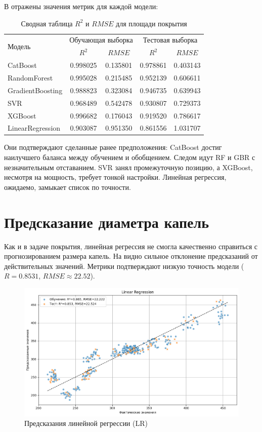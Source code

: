 В  отражены значения метрик для каждой модели:

\begin{table}[htbp!]
	\centering\small
	\caption{Сводная таблица $R^2$ и $RMSE$ для площади покрытия}
	\label{tab:coverage-table}		
	\begin{tabular}{|l|c|c|c|c|}
		\hline
		\multirow{2}{*}{Модель} & \multicolumn{2}{|c|}{Обучающая выборка} & \multicolumn{2}{c|}{Тестовая выборка}\\\cline{2-5} 
		& $R^2$ & $RMSE$ & $R^2$ & $RMSE$\\\hline
		CatBoost&0.998025&0.135801&0.978861&0.403143\\
		RandomForest&0.995028&0.215485&0.952139&0.606611\\
		GradientBoosting&0.988823&0.323084&0.946735&0.639943\\
		SVR&0.968489&0.542478&0.930807&0.729373\\
		XGBoost&0.996682&0.176043&0.919520&0.786617\\
		LinearRegression&0.903087&0.951350&0.861556&1.031707\\
		\hline
	\end{tabular}	
	\normalsize
\end{table}

Они подтверждают сделанные ранее предположения: CatBoost достиг наилучшего баланса между обучением и обобщением. Следом идут RF и GBR с незначительным отставанием. SVR занял промежуточную позицию, а XGBoost, несмотря на мощность, требует тонкой настройки. Линейная регрессия, ожидаемо, замыкает список по точности.

\section{Предсказание диаметра капель}\label{ch3:droplet-size}

Как и в задаче покрытия, линейная регрессия не смогла качественно справиться с прогнозированием размера капель. На  видно сильное отклонение предсказаний от действительных значений. Метрики подтверждают низкую точность модели ($R = 0.8531$, $RMSE \approx 22.52$).

\begin{figure}[htbp!]
	\centering
	\includegraphics[width=.9\linewidth]{my_folder/images/droplet_size/Linear-Regression.png}
	\caption{Предсказания линейной регрессии (LR)} 
	\label{fig:droplet-size-lr}  
\end{figure}


